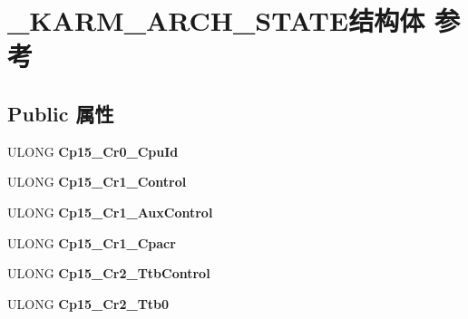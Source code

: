 \hypertarget{struct___k_a_r_m___a_r_c_h___s_t_a_t_e}{}\section{\+\_\+\+K\+A\+R\+M\+\_\+\+A\+R\+C\+H\+\_\+\+S\+T\+A\+T\+E结构体 参考}
\label{struct___k_a_r_m___a_r_c_h___s_t_a_t_e}
\subsection*{Public 属性}
\begin{DoxyCompactItemize}
\item 
\mbox{\label{struct___k_a_r_m___a_r_c_h___s_t_a_t_e_aa65a1b2f8ae5c8d5e239f5dd8e35279c}} 
U\+L\+O\+NG {\bfseries Cp15\+\_\+\+Cr0\+\_\+\+Cpu\+Id}
\item 
\mbox{\label{struct___k_a_r_m___a_r_c_h___s_t_a_t_e_a5bf6b12167708572b6c11cf8bcd37753}} 
U\+L\+O\+NG {\bfseries Cp15\+\_\+\+Cr1\+\_\+\+Control}
\item 
\mbox{\label{struct___k_a_r_m___a_r_c_h___s_t_a_t_e_ae35aea18c8ee16813733ffe4b755f7b2}} 
U\+L\+O\+NG {\bfseries Cp15\+\_\+\+Cr1\+\_\+\+Aux\+Control}
\item 
\mbox{\label{struct___k_a_r_m___a_r_c_h___s_t_a_t_e_a3188cb801166549e354b7dfa66128580}} 
U\+L\+O\+NG {\bfseries Cp15\+\_\+\+Cr1\+\_\+\+Cpacr}
\item 
\mbox{\label{struct___k_a_r_m___a_r_c_h___s_t_a_t_e_a7d0bfe38e90e083d2c9fd74a57ebd9d1}} 
U\+L\+O\+NG {\bfseries Cp15\+\_\+\+Cr2\+\_\+\+Ttb\+Control}
\item 
\mbox{\label{struct___k_a_r_m___a_r_c_h___s_t_a_t_e_a7ca7c83ada319745b4f1acc0c7e7f585}} 
U\+L\+O\+NG {\bfseries Cp15\+\_\+\+Cr2\+\_\+\+Ttb0}
\item 
\mbox{\label{struct___k_a_r_m___a_r_c_h___s_t_a_t_e_ac7e61bcb8ec4fd25e7189da2fb0d48a8}} 

\end{DoxyCompactItemize}
